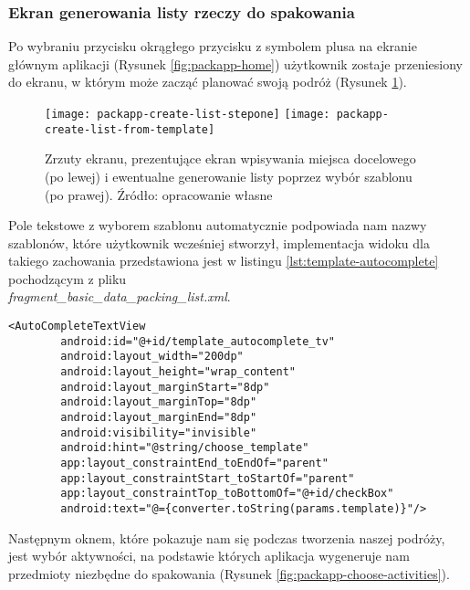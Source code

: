 \documentclass[a4paper,12pt]{article}
\begin{document}
\subsubsection{Ekran generowania listy rzeczy do spakowania}

Po wybraniu przycisku okrągłego przycisku z symbolem plusa na ekranie głównym aplikacji (Rysunek \ref{fig:packapp-home}) użytkownik zostaje przeniesiony do ekranu, w którym może zacząć planować swoją podróż (Rysunek \ref{fig:packapp-create-list-stepone}).

\begin{figure}[H]
    \centering
    \texttt{[image: packapp-create-list-stepone]}
    \hfill
    \texttt{[image: packapp-create-list-from-template]}
    \caption{Zrzuty ekranu, prezentujące ekran wpisywania miejsca docelowego (po lewej) i ewentualne generowanie listy poprzez wybór szablonu (po prawej). Źródło: opracowanie własne}
    \label{fig:packapp-create-list-stepone}
\end{figure}

Pole tekstowe z wyborem szablonu automatycznie podpowiada nam nazwy szablonów, które użytkownik wcześniej stworzył, implementacja widoku dla takiego zachowania przedstawiona jest w listingu \ref{lst:template-autocomplete} pochodzącym z pliku \\ \textit{fragment\_basic\_data\_packing\_list.xml}.

\begin{lstlisting}[caption=Fragment widoku pokazujący automatyczne wypełnianie pola wyboru szablonu, label={lst:template-autocomplete}]
        <AutoCompleteTextView
        android:id="@+id/template_autocomplete_tv"
        android:layout_width="200dp"
        android:layout_height="wrap_content"
        android:layout_marginStart="8dp"
        android:layout_marginTop="8dp"
        android:layout_marginEnd="8dp"
        android:visibility="invisible"
        android:hint="@string/choose_template"
        app:layout_constraintEnd_toEndOf="parent"
        app:layout_constraintStart_toStartOf="parent"
        app:layout_constraintTop_toBottomOf="@+id/checkBox"
        android:text="@={converter.toString(params.template)}"/>
\end{lstlisting}

Następnym oknem, które pokazuje nam się podczas tworzenia naszej podróży, jest wybór aktywności, na podstawie których aplikacja wygeneruje nam przedmioty niezbędne do spakowania (Rysunek \ref{fig:packapp-choose-activities}).
\end{document}

